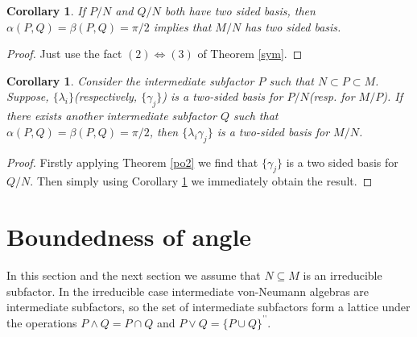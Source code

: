 \documentclass[11pt,letterpaper]{amsart}
\newtheorem{corollary}[theorem]{Corollary}
\theoremstyle{definition}
\theoremstyle{remark}
\DeclareMathOperator*{\dprime}{\prime \prime}
\begin{document}
\begin{corollary}\label{twosided}
 If $P/N$ and $Q/N$ both have two sided basis, then $\alpha(P,Q)= \beta(P,Q)= \pi/2$ implies that $M/N$ has two sided basis.
\end{corollary}
\begin{proof}
 Just use the fact $(2)\Leftrightarrow (3)$ of Theorem \ref{sym}.
\end{proof}
\begin{corollary}
Consider  the intermediate subfactor $P$ such that $N\subset P \subset M$.
 Suppose, $\{\lambda_i\}$(respectively, $\{\gamma_j\}$) is a two-sided basis for $P/N$(resp. for $M/P$).
 If there exists another intermediate subfactor $Q$ such that $\alpha(P,Q)= \beta(P,Q)= \pi/2$, then
 $\{\lambda_i \gamma_j\}$ is a two-sided basis for $M/N$.
\end{corollary}

\begin{proof}
 Firstly applying Theorem \ref{po2} we find that $\{\gamma_j\}$ is a two sided basis for $Q/N$. Then simply using Corollary \ref{twosided} we immediately obtain the result.
\end{proof}

 
 
\section{Boundedness  of angle}\label{Sec:rigidity}


In this section  and the next section we assume that $N\subseteq M$ is  an irreducible subfactor. 
In the irreducible case intermediate von-Neumann algebras are intermediate subfactors, so the set of intermediate subfactors form a lattice under the operations $P\wedge Q= P\cap Q$ and $P\vee Q= \{P\cup Q\}^{\dprime}$.
\end{document}
